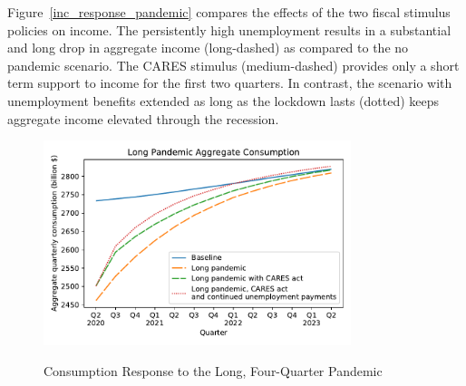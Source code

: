 \documentclass[titlepage,a4paper]{\econtex}
\begin{document}
Figure~\ref{inc_response_pandemic} compares the effects of the two fiscal stimulus policies on income.
The persistently high unemployment results in a substantial and long drop in aggregate income (long-dashed) as compared to the no pandemic scenario.
The CARES stimulus (medium-dashed) provides only a short term support to income for the first two quarters.
In contrast, the scenario with unemployment benefits extended as long as the lockdown lasts (dotted) keeps aggregate income elevated through the recession.

\begin{figure}
  \centering
  \caption{Consumption Response to the Long, Four-Quarter Pandemic}
  \label{cons_response_pandemic}
  { \includegraphics[width=0.8\textwidth]{./Figures/DeepPandemic}}
\end{figure}
\end{document}
